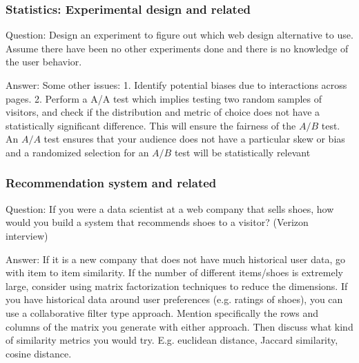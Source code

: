 \documentclass[11pt]{beamer}
\begin{document}
\begin{frame}
\frametitle{Statistics: Experimental design and related}
\begin{block}{Question:}
	Design an experiment to figure out which web design alternative to use. Assume there have been no other experiments done and there is no knowledge of the user behavior.
\end{block}
\begin{block}{Answer:}
	Some other issues:
	1. Identify potential biases due to interactions across pages. 
	2. Perform a A/A test which implies testing two random samples of visitors, and check if the distribution and metric of choice does not have a statistically significant difference. This will ensure the fairness of the $A/B$ test. An $A/A$ test ensures that your audience does not have a particular skew or bias and a randomized selection for an $A/B$ test will be statistically relevant
\end{block}
\end{frame}

\begin{frame}
\frametitle{Recommendation system and related}
\begin{block}{Question:}
	If you were a data scientist at a web company that sells shoes, how would you build a system that recommends shoes to a visitor? (Verizon interview)
\end{block}
\begin{block}{Answer:}
	If it is a new company that does not have much historical user data, go with item­ to item similarity. If the number of different items/shoes is extremely large, consider using matrix factorization techniques to reduce the dimensions.
	If you have historical data around user preferences (e.g. ratings of shoes), you can use a collaborative filter type approach. Mention specifically the rows and columns of the matrix you generate with either approach. Then discuss what kind of similarity metrics you would try. E.g. euclidean distance, Jaccard similarity, cosine distance.
\end{block}
\end{frame}
\end{document}
